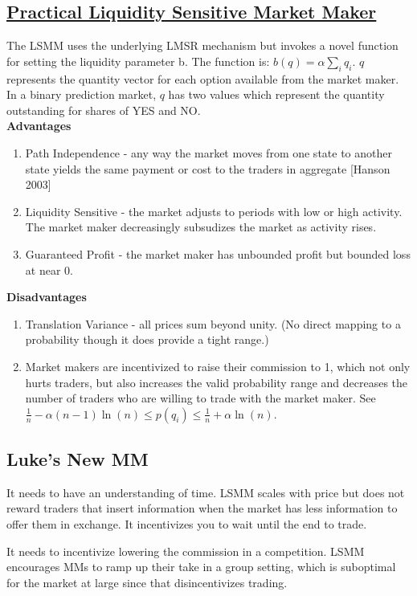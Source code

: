 \subsection{\href{https://www.cs.cmu.edu/~sandholm/liquidity-sensitive automated market maker.teac.pdf}{Practical Liquidity Sensitive Market Maker}}
The LSMM uses the underlying LMSR mechanism but invokes a novel
function for setting the liquidity parameter b. The function is:
$b(q) = \alpha \sum_{i} q_i$. $q$ represents the quantity vector
for each option available from the market maker. In a binary
prediction market, $q$ has two values which represent the quantity
outstanding for shares of YES and NO.\\

\textbf{Advantages}\\
\begin{enumerate}
\item{Path Independence - any way the market moves from one state to another state yields the same payment or cost to the traders in aggregate [Hanson 2003]}
\item{Liquidity Sensitive - the market adjusts to periods with low or high activity. The market maker decreasingly subsudizes the market as activity rises.}
\item{Guaranteed Profit - the market maker has unbounded profit but bounded
loss at near 0.}
\end{enumerate}

\textbf{Disadvantages} \\
\begin{enumerate}
\item{Translation Variance - all prices sum beyond unity. (No direct mapping to a probability though it does provide a tight range.)}
\item Market makers are incentivized to raise their commission to 1, which not only hurts traders, but also increases the valid probability range
and decreases the number of traders who are willing to trade with the market maker. See $\frac{1}{n} - \alpha(n - 1)\ln(n) \leq p(q_i) \leq \frac{1}{n} + \alpha\ln(n)$.
\end{enumerate}

\subsection{Luke's New MM}

It needs to have an understanding of time. LSMM scales with price but does not reward traders that insert information when the market has less information to offer them in exchange. It incentivizes you to wait until the
end to trade.

It needs to incentivize lowering the commission in a competition. LSMM 
encourages MMs to ramp up their take in a group setting, which is
suboptimal for the market at large since that disincentivizes trading.
